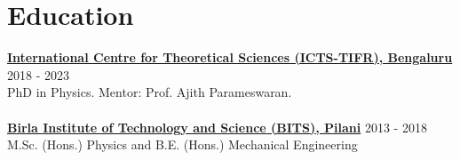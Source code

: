 \begin{comment}
			\section{Projects}
			\begin{itemize}[leftmargin=*]
				\item \textbf{Aditya Vijaykumar}, MV Saketh, Sumit Kumar, Parameswaran Ajith, Tirthankar Roy Choudhury.\\
				\textit{Probing the cosmological large-scale structure using gravitational-wave observations} \\
				\textit{(manuscript under LIGO PnP review, to be submitted to arXiv soon)}
				\\
				\item \textbf{Aditya Vijaykumar}, Shasvath Kapadia, Parameswaran Ajith.\\
				\textit{Constraining the time-variation of the Gravitational constant using gravitational-wave observations of binary neutron stars} \\
				\textit{(manuscript under LIGO PnP review, to be submitted to arXiv soon)}
				\\
				\item \textbf{Aditya Vijaykumar}, Nathan Johnson-McDaniel, Rahul Kashyap, Arunava Mukherjee, Parameswaran Ajith.\\	
				\textit{Constraints on Black Hole Mimickers from the Gravitational-wave Transient Catalog (GWTC) -1 }
				\\
				\item Apratim Ganguly, \textbf{Aditya Vijaykumar}, Abhirup Ghosh, Parameswaran Ajith.\\	
				\textit{Probing General Relativity from the consistency of inspiral and merger-ringdown of Binary Black Holes}
				
				
			\end{itemize}
			
		\end{comment}
		
		\section{Education}
		\textbf{\href{https://www.icts.res.in/}{International Centre for Theoretical Sciences (ICTS-TIFR), Bengaluru}} \hfill 2018 - 2023\\
            PhD in Physics. {Mentor: Prof. Ajith Parameswaran}.\\
             \\
            \textbf{\href{http://www.bits-pilani.ac.in/}{Birla Institute of Technology and Science (BITS), Pilani}} \hfill 2013 - 2018\\
		{M.Sc. (Hons.) Physics and B.E. (Hons.) Mechanical Engineering}

